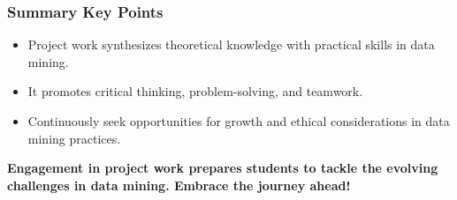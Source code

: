 \documentclass[aspectratio=169]{beamer}
\begin{document}
\begin{frame}[fragile]
    \frametitle{Summary Key Points}

    \begin{itemize}
        \item Project work synthesizes theoretical knowledge with practical skills in data mining.
        \item It promotes critical thinking, problem-solving, and teamwork.
        \item Continuously seek opportunities for growth and ethical considerations in data mining practices.
    \end{itemize}

    \textbf{Engagement in project work prepares students to tackle the evolving challenges in data mining. Embrace the journey ahead!}
\end{frame}
\end{document}
